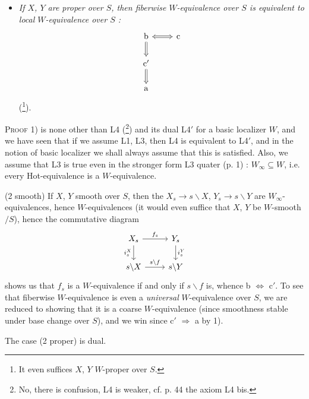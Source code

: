 \begin{itemize}
(\footnote[23]{it even suffices $X$, $Y$ $W$-smooth over $S$.}).

\item[(2 prop)] \textit{If $X$, $Y$ are proper over $S$, then fiberwise $W$-equivalence over $S$ is equivalent to local $W$-equivalence over $S$ :}
\[
\begin{tikzcd}
\text{b} \arrow[r, Leftrightarrow] \arrow[d, Rightarrow] & \text{c} \\
\text{c}' \arrow[d, Rightarrow] & \\
\text{a} &
\end{tikzcd}
\]
(\footnote[24]{It even suffices $X$, $Y$ $W$-proper over $S$.}).
\end{itemize}

\textsc{Proof} 1) is none other than L4 (\footnote[25]{No, there is confusion, L4 is weaker, cf. p. 44 the axiom L4 bis.}) and its dual L4$'$ for a basic localizer $W$, and we have seen that if we assume L1, L3, then L4 is equivalent to L4$'$, and in the notion of basic localizer we shall always assume that this is satisfied. Also, we assume that L3 is true even in the stronger form L3 quater (p. 1) : $W_\infty \subseteq W$, i.e. every Hot-equivalence is a $W$-equivalence.

(2 smooth) If $X$, $Y$ smooth over $S$, then the $X_s \longrightarrow s\backslash X$, $Y_s \longrightarrow s\backslash Y$ are $W_\infty$-equivalences, hence $W$-equivalences (it would even suffice that $X$, $Y$ be $W$-smooth$/S$), hence the commutative diagram
\[
\begin{tikzcd}
X_s \arrow[r, "f_s"] \arrow[d, "i_s^X"'] & Y_s \arrow[d, "i_s^Y"] \\
s\backslash X \arrow[r, "s\backslash f"] & s\backslash Y
\end{tikzcd}
\]
shows us that $f_s$ is a $W$-equivalence if and only if $s\backslash f$ is, whence b $\Longleftrightarrow$ c$'$. To see that fiberwise $W$-equivalence is even a \textit{universal} $W$-equivalence over $S$, we are reduced to showing that it is a coarse $W$-equivalence (since smoothness stable under base change over $S$), and we win since c$'$ $\Longrightarrow$ a by 1).

The case (2 proper) is dual.

